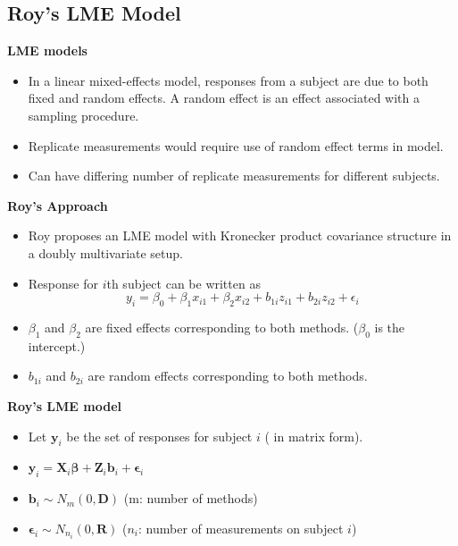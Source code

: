 \documentclass[compress]{beamer}        %
\makeatletter
\newcommand{\tcb}{\textcolor{beamer@blendedblue}}
\makeatother
\begin{document}
\subsection{Roy's LME Model}
\begin{frame}{\bf \tcb{LME models}}
\begin{itemize}\itemsep0.7cm
\item In a linear mixed-effects model, responses from a subject are due to both fixed and random
effects. A random effect is an effect associated with a sampling procedure.
\item Replicate measurements would require use of random effect terms in model.
\item Can have differing number of replicate measurements for different subjects.
\end{itemize}
\end{frame}
\begin{frame}{\bf \tcb{Roy's Approach}}
\begin{itemize}\itemsep0.7cm
\item Roy proposes an LME model with Kronecker product covariance structure in a doubly multivariate setup.
\item Response for $i$th subject can be written as
\[ y_i = \beta_0 + \beta_1x_{i1} + \beta_2x_{i2} + b_{1i}z_{i1}  + b_{2i}z_{i2} + \epsilon_i \]
\item $\beta_1$ and $\beta_2$ are fixed effects corresponding to both methods. ($\beta_0$ is the intercept.)
\item $b_{1i}$ and $b_{2i}$ are random effects corresponding to both methods.
\end{itemize}
\end{frame}

\begin{frame}{\bf \tcb{Roy's LME model}}
\begin{itemize}\itemsep0.7cm

\item Let $\boldsymbol{y}_i$ be the set of responses for subject $i$ ( in matrix form).
\item $\boldsymbol{y}_i = \boldsymbol{X}_i\boldsymbol{\beta} + \boldsymbol{Z}_i \boldsymbol{b}_i + \boldsymbol{\epsilon}_i$
\item $\boldsymbol{b}_i \sim N_m(0,\boldsymbol{D})$  (m: number of methods)
\item $\boldsymbol{\epsilon}_i \sim N_{n_i}(0,\boldsymbol{R})$ ($n_i$: number of measurements on subject $i$)
\end{itemize}
\end{frame}
\end{document}
